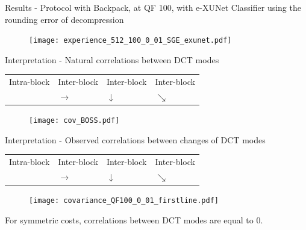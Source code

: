\documentclass[10pt,aspectratio=169]{beamer}
\begin{document}
\begin{frame}{Results - Protocol with Backpack, at QF 100, with e-XUNet}
Classifier using the rounding error of decompression~
    \begin{figure}[h]
        \texttt{[image: experience\_512\_100\_0\_01\_SGE\_exunet.pdf]}
    \end{figure}
\end{frame}


\begin{frame}{Interpretation - Natural correlations between DCT modes~}
    \begin{tabularx}{0.9\textwidth} { 
        >{\centering\arraybackslash}X 
        >{\centering\arraybackslash}X 
        >{\centering\arraybackslash}X
        >{\centering\arraybackslash}X  }
        Intra-block & Inter-block & Inter-block & Inter-block \\ 
        &  $\rightarrow$ & $\downarrow$& $\searrow$ 
   \end{tabularx}

    \begin{figure}[h]
        \texttt{[image: cov\_BOSS.pdf]}
    \end{figure}
\end{frame}


\begin{frame}{Interpretation - Observed correlations between changes of DCT modes}
        

    \begin{tabularx}{0.9\textwidth} { 
         >{\centering\arraybackslash}X 
         >{\centering\arraybackslash}X 
         >{\centering\arraybackslash}X
         >{\centering\arraybackslash}X  }
         Intra-block & Inter-block & Inter-block & Inter-block \\ 
         &  $\rightarrow$ & $\downarrow$& $\searrow$ 
    \end{tabularx}

    \begin{figure}[h]
        \texttt{[image: covariance\_QF100\_0\_01\_firstline.pdf]}
    \end{figure}

    \pause
    For symmetric costs, correlations between DCT modes are equal to 0. 
    
\end{frame}
\end{document}
